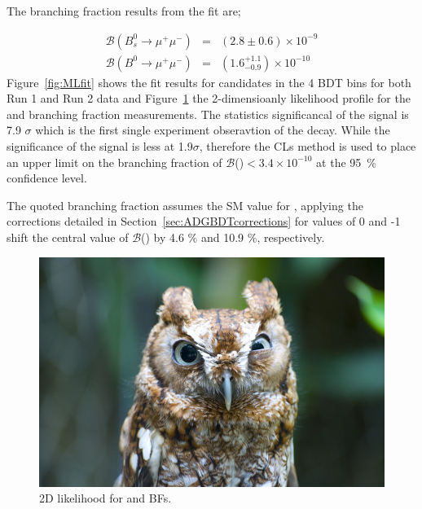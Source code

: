 The branching fraction results from the fit are;

\begin{eqnarray}
  \mathcal{B}(B^{0}_{s} \to \mu^{+} \mu^{-}) &=& (2.8 \pm 0.6) \times 10^{-9} \\
  \mathcal{B}(B^{0} \to \mu^{+} \mu^{-}) &=& (1.6^{+1.1}_{-0.9})    \times 10^{-10} 
\label{eq:BFresults}
\end{eqnarray}
Figure~\ref{fig:MLfit} shows the fit results for \bmumu candidates in the 4 BDT bins for both Run 1 and Run 2 data and Figure~\ref{fig:contour} the 2-dimensioanly likelihood profile for the \bdmumu and \bsmumu branching fraction measurements.
The statistics significancal of the \bsmumu signal is 7.9 $\sigma$ which is the first single experiment obseravtion of the \bsmumu decay. While the significance of the \bdmumu signal is less at 1.9$\sigma$, therefore the CLs method is used to place an upper limit on the branching fraction of $\mathcal{B}$(\bdmumu)$ < 3.4 \times 10^{-10}$  at the 95~$\%$ confidence level.

The quoted \bsmumu branching fraction assumes the SM value for \ADG, applying the corrections detailed in Section~\ref{sec:ADGBDTcorrections} for \ADG values of 0 and -1 shift the central value of $\mathcal{B}$(\bsmumu) by 4.6 $\%$ and 10.9 $\%$, respectively. 





\begin{figure}[htbp]
    \centering
        \includegraphics[width= 0.8 \textwidth]{./Figs/BFAnalysis/placeholder.jpeg}
      \caption{2D likelihood for \bd and \bs BFs. }
    \label{fig:contour}
\end{figure}


